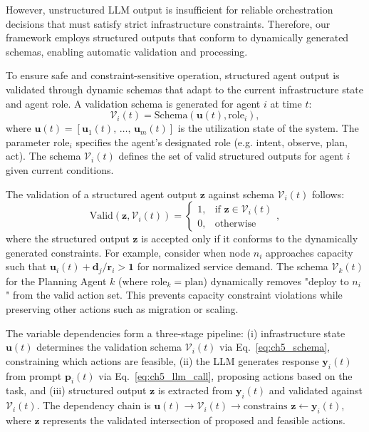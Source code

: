 However, unstructured \ac{LLM} output is insufficient for reliable orchestration decisions that must satisfy strict infrastructure constraints. Therefore, our framework employs structured outputs that conform to dynamically generated schemas, enabling automatic validation and processing.

To ensure safe and constraint-sensitive operation, structured agent output is validated through dynamic schemas that adapt to the current infrastructure state and agent role. A validation schema is generated for agent $i$ at time $t$:
\begin{equation}
\mathcal{V}_i(t) = \text{Schema}(\mathbf{u}(t), \text{role}_i),
\label{eq:ch5_schema}
\end{equation}
where $\mathbf{u}(t) = [\mathbf{u}_1(t),\, \ldots,\, \mathbf{u}_m(t)]$ is the utilization state of the system. The parameter $\text{role}_i$ specifies the agent's designated role (e.g. intent, observe, plan, act). The schema $\mathcal{V}_i(t)$ defines the set of valid structured outputs for agent $i$ given current conditions.

The validation of a structured agent output $\mathbf{z}$ against schema $\mathcal{V}_i(t)$ follows:
\begin{equation}
\text{Valid}(\mathbf{z}, \mathcal{V}_i(t)) = \begin{cases}
1, & \text{if } \mathbf{z} \in \mathcal{V}_i(t) \\
0, & \text{otherwise}
\end{cases},
\label{eq:ch5_validation}
\end{equation}
where the structured output $\mathbf{z}$ is accepted only if it conforms to the dynamically generated constraints. For example, consider when node $n_i$ approaches capacity such that $\mathbf{u}_i(t) + \mathbf{d}_j/\mathbf{r}_i > \mathbf{1}$ for normalized service demand. The schema $\mathcal{V}_k(t)$ for the Planning Agent $k$ (where $\text{role}_k = \text{plan}$) dynamically removes "deploy to $n_i$" from the valid action set. This prevents capacity constraint violations while preserving other actions such as migration or scaling.

The variable dependencies form a three-stage pipeline: (i) infrastructure state $\mathbf{u}(t)$ determines the validation schema $\mathcal{V}_i(t)$ via Eq.~\ref{eq:ch5_schema}, constraining which actions are feasible, (ii) the \ac{LLM} generates response $\mathbf{y}_i(t)$ from prompt $\mathbf{p}_i(t)$ via Eq.~\ref{eq:ch5_llm_call}, proposing actions based on the task, and (iii) structured output $\mathbf{z}$ is extracted from $\mathbf{y}_i(t)$ and validated against $\mathcal{V}_i(t)$. The dependency chain is $\mathbf{u}(t) \to \mathcal{V}_i(t) \to \text{constrains } \mathbf{z} \leftarrow \mathbf{y}_i(t)$, where $\mathbf{z}$ represents the validated intersection of proposed and feasible actions.

